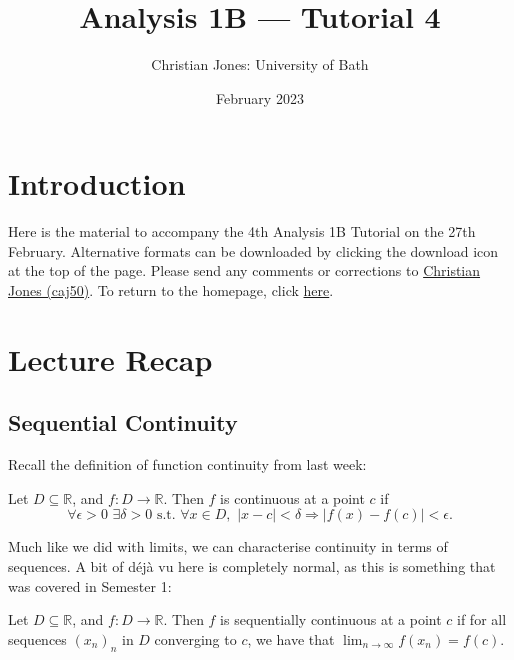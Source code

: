 \documentclass[
  17pt,
  a4paper]{extarticle}
\title{Analysis 1B --- Tutorial 4}
\author{Christian Jones: University of Bath}
\date{February 2023}
\theoremstyle{plain}
\theoremstyle{definition}
\theoremstyle{plain}
\theoremstyle{plain}
\theoremstyle{plain}
\theoremstyle{plain}
\theoremstyle{definition}
\theoremstyle{definition}
\theoremstyle{remark}
\theoremstyle{remark}
\let\BeginKnitrBlock\begin \let\EndKnitrBlock\end
\renewcommand{\;}{\,}
\begin{document}
\maketitle

{
\setcounter{tocdepth}{2}
\tableofcontents
}
\newpage
{}

\hypertarget{introduction}{%
\section*{Introduction}\label{introduction}}

Here is the material to accompany the 4th Analysis 1B Tutorial on the 27th February. Alternative formats can be downloaded by clicking the download icon at the top of the page. Please send any comments or corrections to \href{mailto:caj50@bath.ac.uk}{Christian Jones (caj50)}. To return to the homepage, click \href{http://caj50.github.io/tutoring.html}{here}.

\hypertarget{lecture-recap}{%
\section{Lecture Recap}\label{lecture-recap}}

\hypertarget{sequential-continuity}{%
\subsection{Sequential Continuity}\label{sequential-continuity}}

Recall the definition of function continuity from last week:
\BeginKnitrBlock{definition}[Continuity]
{\label{def:def1} }Let \(D \subseteq \mathbb{R}\), and \(f: D \to \mathbb{R}\). Then \(f\) is continuous at a point \(c\) if \[\forall \epsilon > 0\;\;\exists \delta > 0\;\;\text{s.t.}\;\;\forall x \in D,\;\; \lvert x - c \rvert < \delta \Rightarrow \lvert f(x) - f(c) \rvert < \epsilon.\]
\EndKnitrBlock{definition}
Much like we did with limits, we can characterise continuity in terms of sequences. A bit of déjà vu here is completely normal, as this is something that was covered in Semester 1:

\BeginKnitrBlock{definition}[Sequential Continuity]
{\label{def:def2} }Let \(D \subseteq \mathbb{R}\), and \(f: D \to \mathbb{R}\). Then \(f\) is sequentially continuous at a point \(c\) if for all sequences \((x_n)_n\) in \(D\) converging to \(c\), we have that \(\lim_{n \to \infty}f(x_n) = f(c).\)
\EndKnitrBlock{definition}
\end{document}
